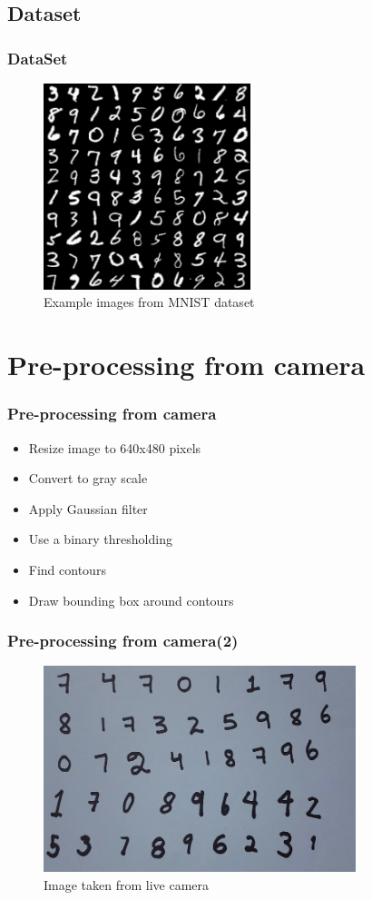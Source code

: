 \documentclass[11.5pt,aspectratio=1610,xcolor={usenames,dvipsnames,table}]{beamer}
\begin{document}
\begin{frame}

\section{Dataset}
\frametitle{DataSet}

\begin{figure}[!h]
	\includegraphics[height = 6cm]{images/mnist-digits-small.png}
	\caption{Example images from MNIST dataset \cite{mnist}}
\end{figure}

\end{frame}


\section{Pre-processing from camera}
\begin{frame}
\frametitle{Pre-processing from camera}

\begin{itemize}
	\item Resize image to 640x480 pixels
	\item Convert to gray scale
	\item Apply Gaussian filter
	\item Use a binary thresholding
	\item Find contours
	\item Draw bounding box around contours
\end{itemize}
\end{frame}

\begin{frame}
\frametitle{Pre-processing from camera(2)}

\begin{figure}[!h]
	\includegraphics[height = 6cm]{images/orig.png}
	\caption{Image taken from live camera }
\end{figure}

\end{frame}
\end{document}
